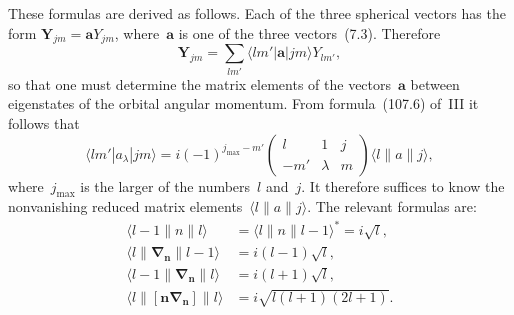 These formulas are derived as follows. Each of the three spherical vectors has the form $\mathbf{Y}_{jm} = \mathbf{a}Y_{jm}$, where~$\mathbf{a}$ is one of the three vectors~(7.3). Therefore
\[
\mathbf{Y}_{jm} = \sum_{lm'}\langle lm'|\mathbf{a}|jm\rangle Y_{lm'},
\]
so that one must determine the matrix elements of the vectors~$\mathbf{a}$ between eigenstates of the orbital angular momentum. From formula~(107.6) of~III it follows that
\[
\langle lm'|a_\lambda|jm\rangle = i(-1)^{j_{\max}-m'}\begin{pmatrix}l & 1 & j \\ -m' & \lambda & m\end{pmatrix}\langle l\|a\|j\rangle,
\]
where~$j_{\max}$ is the larger of the numbers~$l$ and~$j$. It therefore suffices to know the nonvanishing reduced matrix elements~$\langle l\|a\|j\rangle$. The relevant formulas are:
\begin{equation}
\begin{aligned}
\langle l-1\|n\|l\rangle &= \langle l\|n\|l-1\rangle^* = i\sqrt{l},\\
\langle l\|\boldsymbol{\nabla}_\mathbf{n}\|l-1\rangle &= i(l-1)\sqrt{l},\\
\langle l-1\|\boldsymbol{\nabla}_\mathbf{n}\|l\rangle &= i(l+1)\sqrt{l},\\
\langle l\|[\mathbf{n}\boldsymbol{\nabla}_\mathbf{n}]\|l\rangle &= i\sqrt{l(l+1)(2l+1)}.
\end{aligned}
\tag{7.17}
\end{equation}

